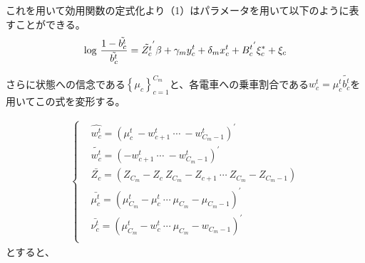 \documentclass{jsarticle}
\begin{document}
これを用いて効用関数の定式化より（1）はパラメータを用いて以下のように表すことができる。
\begin{align}
	{\rm log}\ \frac{1 - \tilde{{b_c^t}}}{\tilde{b_c^t}} = \tilde{Z_c^t}^{'} \beta + \gamma_m y_c^t + \delta_m x_c^t + {B_c^t}^{'} \xi_c^{*} + \xi_c
\end{align}

さらに状態への信念である$\left\{ \mu_c \right\}_{c = 1}^{C_m}$と、各電車への乗車割合である$w_c^t = \mu_c^t \tilde{b_c^t}$を用いてこの式を変形する。

\begin{align*}
	\begin{cases}
	&\hat{w_c^t} = \left( \mu_c^t\  -w_{c+1}^t\  \cdots\  -w_{C_m-1}^t\right)^{'}\\[8pt]
	&\tilde{w_c^t} =  \left( -w_{c+1}^t\  \cdots\  -w_{C_m-1}^t\right)^{'}\\[8pt]
	&\bar{Z_c} = \left(Z_{C_m} - Z_c\ Z_{C_m} - Z_{c+1}\ \cdots\ Z_{C_m} - Z_{C_m - 1}\right)\\[8pt]
	&\bar{\mu_c^t} = \left( \mu_{C_m}^t - \mu_c^t\ \cdots\ \mu_{C_m} - \mu_{C_m-1} \right)^{'}\\[8pt]
	&\bar{\nu_c^t} = \left( \mu_{C_m}^t - w_c^t\ \cdots\ \mu_{C_m} - w_{C_m-1} \right)^{'}\\[8pt]
	\end{cases}
\end{align*}
とすると、
\end{document}
